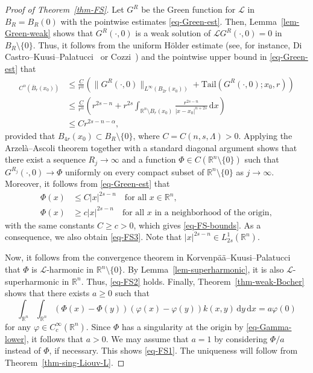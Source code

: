 \documentclass[11pt]{amsart}
\theoremstyle{plain}
\theoremstyle{definition}
\numberwithin{equation}{section}
\begin{document}
\begin{proof}[Proof of Theorem~\ref{thm-FS}]
Let $G^R$ be the Green function for $\mathcal{L}$ in $B_R=B_R(0)$ with the pointwise estimates \eqref{eq-Green-est}. Then, Lemma~\ref{lem-Green-weak} shows that $G^R(\cdot, 0)$ is a weak solution of $\mathcal{L}G^R(\cdot, 0)=0$ in $B_R \setminus \{0\}$. Thus, it follows from the uniform H\"older estimate (see, for instance, Di Castro--Kuusi--Palatucci~\cite[Theorem~1.2]{DCKP16} or Cozzi~\cite[Theorem~6.4]{Coz17}) and the pointwise upper bound in \eqref{eq-Green-est} that
\begin{align*}
[G^R(\cdot, 0)]_{C^\alpha(\overline{B}_r(x_0))}
&\leq \frac{C}{r^\alpha} \left( \|G^R(\cdot, 0)\|_{L^\infty(B_{2r}(x_0))} + \mathrm{Tail}(G^R(\cdot, 0); x_0, r) \right) \\
&\leq \frac{C}{r^\alpha} \left( r^{2s-n} + r^{2s} \int_{\mathbb{R}^n \setminus B_r(x_0)} \frac{r^{2s-n}}{|x-x_0|^{n+2s}} \,\mathrm{d}x \right) \\
&\leq C r^{2s-n-\alpha},
\end{align*}
provided that $B_{4r}(x_0) \subset B_R \setminus \{0\}$, where $C=C(n, s, \Lambda)>0$. Applying the Arzel\`a--Ascoli theorem together with a standard diagonal argument shows that there exist a sequence $R_j \to \infty$ and a function $\Phi \in C(\mathbb{R}^n \setminus \{0\})$ such that $G^{R_j}(\cdot, 0) \to \Phi$ uniformly on every compact subset of $\mathbb{R}^n \setminus \{0\}$ as $j \to \infty$. Moreover, it follows from \eqref{eq-Green-est} that
\begin{align}
\Phi(x) &\leq C |x|^{2s-n} \quad\text{for all }x \in \mathbb{R}^n, \nonumber\\
\Phi(x) &\geq c |x|^{2s-n} \quad\text{for all }x\text{ in a neighborhood of the origin}, \label{eq-Gamma-lower}
\end{align}
with the same constants $C\geq c>0$, which gives \eqref{eq-FS-bounds}. As a consequence, we also obtain \eqref{eq-FS3}. Note that $|x|^{2s-n} \in L^1_{2s}(\mathbb{R}^n)$.

Now, it follows from the convergence theorem in Korvenp\"a\"a--Kuusi--Palatucci~\cite[Corollary~5]{KKP17} that $\Phi$ is $\mathcal{L}$-harmonic in $\mathbb{R}^n \setminus \{0\}$. By Lemma~\ref{lem-superharmonic}, it is also $\mathcal{L}$-superharmonic in $\mathbb{R}^n$. Thus, \eqref{eq-FS2} holds. Finally, Theorem~\ref{thm-weak-Bocher} shows that there exists $a \geq 0$ such that
\begin{equation*}
\int_{\mathbb{R}^n} \int_{\mathbb{R}^n} (\Phi(x)-\Phi(y))(\varphi(x)-\varphi(y)) k(x, y) \,\mathrm{d}y \,\mathrm{d}x= a\varphi(0)
\end{equation*}
for any $\varphi \in C^\infty_c(\mathbb{R}^n)$. Since $\Phi$ has a singularity at the origin by \eqref{eq-Gamma-lower}, it follows that $a>0$. We may assume that $a=1$ by considering $\Phi/a$ instead of $\Phi$, if necessary. This shows \eqref{eq-FS1}. The uniqueness will follow from Theorem~\ref{thm-sing-Liouv-L}.
\end{proof}
\end{document}
